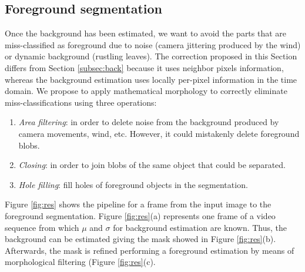 \documentclass{article}
\begin{document}
\subsection{Foreground segmentation}
\label{subsec:fore}

Once the background has been estimated, we want to avoid the parts that are miss-classified as foreground due to noise (camera jittering produced by the wind) or dynamic background (rustling leaves). The correction proposed in this Section differs from Section \ref{subsec:back} because it uses neighbor pixels information, whereas the background estimation uses locally per-pixel information in the time domain. We propose to apply mathematical morphology to correctly eliminate miss-classifications using three operations:

\begin{enumerate}
	\item \emph{Area filtering}: in order to delete noise from the background produced by camera movements, wind, etc. However, it could mistakenly delete foreground blobs.
    \item \emph{Closing}: in order to join blobs of the same object that could be separated.
    \item \emph{Hole filling}: fill holes of foreground objects in the segmentation.
\end{enumerate}

Figure \ref{fig:res} shows the pipeline for a frame from the input image to the foreground segmentation. Figure \ref{fig:res}(a) represents one frame of a video sequence from which \(\mu\) and \(\sigma\) for background estimation are known. Thus, the background can be estimated giving the mask showed in Figure \ref{fig:res}(b). Afterwards, the mask is refined performing a foreground estimation by means of morphological filtering (Figure \ref{fig:res}(c).
\end{document}
